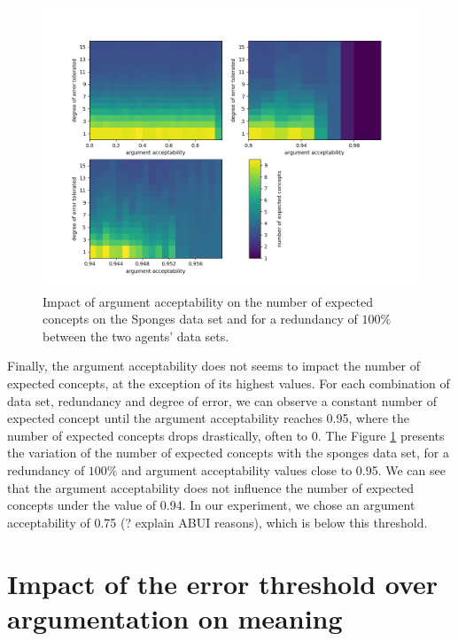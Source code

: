 \begin{figure}[t]
    \centering
    \includegraphics[width = \textwidth]{figs/Figure_AA.png}
    \caption{Impact of argument acceptability on the number of expected concepts on the Sponges data set and for a redundancy of $100\%$ between the two agents' data sets.}
    \label{fig:aa}
\end{figure}

Finally, the argument acceptability does not seems to impact the number of expected concepts, at the exception of its highest values. For each combination of data set, redundancy and degree of error, we can observe a constant number of expected concept until the argument acceptability reaches 0.95, where the number of expected concepts drops drastically, often to 0. The Figure \ref{fig:aa} presents the variation of the number of expected concepts with the sponges data set, for a redundancy of $100 \%$ and argument acceptability values close to 0.95. We can see that the argument acceptability does not influence the number of expected concepts under the value of 0.94. In our experiment, we chose an argument acceptability of 0.75 (? explain ABUI reasons), which is below this threshold.

\section{Impact of the error threshold over argumentation on meaning}

